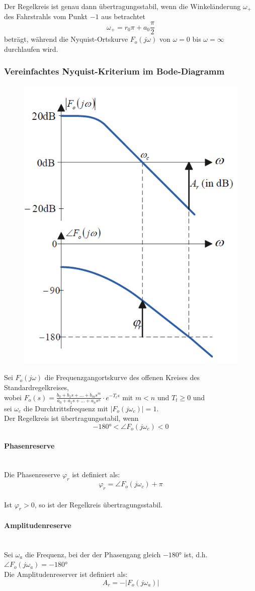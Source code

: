 \documentclass[10pt,a4paper]{article}
\begin{document}
Der Regelkreis ist genau dann übertragungsstabil, wenn die Winkeländerung $\omega_+$ des Fahrstrahls vom Punkt $-1$ aus betrachtet
$$
	\omega_+ = r_0 \pi + a_0 \frac{\pi}{2}
$$
	beträgt, während die Nyquist-Ortskurve $F_o(j \omega)$ von $\omega = 0$ bis $\omega = ∞$ durchlaufen wird.

\subsubsection{Vereinfachtes Nyquist-Kriterium im Bode-Diagramm}
\begin{figure}[H]
	\includegraphics[width = 0.4\columnwidth]{imgs/nyquist_bode.png}
\end{figure}
Sei $F_o(j \omega)$ die Frequenzgangortskurve des offenen Kreises des Standardregelkreises, \\
wobei $F_o(s) = \frac{b_0 + b_1s + \dots + b_ms^m}{a_0 + a_1s + \dots + a_ns^n} ⋅ e^{-T_ts}$ mit $m < n$ und $T_t ≥ 0$ und \\
sei $\omega_c$ die Durchtrittsfrequenz mit $|F_o(j \omega_c)| = 1$. \\
Der Regelkreis ist übertragungsstabil, wenn
$$
	-180° < \angle F_o(j \omega_c) < 0
$$

\paragraph{Phasenreserve} ~\\
Die Phasenreserve $\varphi_r$ ist definiert als:
$$
	\varphi_r = \angle F_o(j \omega_c) + \pi
$$ \\

Ist $\varphi_r > 0$, so ist der Regelkreis übertragungsstabil.

\paragraph{Amplitudenreserve} ~\\
Sei $\omega_a$ die Frequenz, bei der der Phasengang gleich $-180°$ ist, d.h. $\angle F_o(j \omega_a) = -180°$ \\
Die Amplitudenreserver ist definiert als:
$$
	A_r = -|F_o(j \omega_a)|
$$ \\
\end{document}
